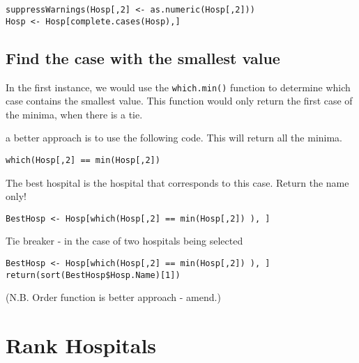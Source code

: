 \documentclass[]{article}
\begin{document}
\begin{verbatim}
suppressWarnings(Hosp[,2] <- as.numeric(Hosp[,2]))
Hosp <- Hosp[complete.cases(Hosp),]
\end{verbatim}

\subsection{Find the case with the smallest value}

In the first instance, we would use the \texttt{which.min()} function to determine which case contains the smallest value.
This function would only return the first case of the minima, when there is a tie.

a better approach is to use the following code. This will return all the minima.
\begin{framed}
\begin{verbatim}
which(Hosp[,2] == min(Hosp[,2])
\end{verbatim}
\end{framed}

The best hospital is the hospital that corresponds to this case. Return the name only!

\begin{verbatim}
BestHosp <- Hosp[which(Hosp[,2] == min(Hosp[,2]) ), ]
\end{verbatim}

Tie breaker - in the case of two hospitals being selected

\begin{verbatim}
BestHosp <- Hosp[which(Hosp[,2] == min(Hosp[,2]) ), ]
return(sort(BestHosp$Hosp.Name)[1])
\end{verbatim}

(N.B. Order function is better approach - amend.)


\newpage
\section{Rank Hospitals}
\end{document}

